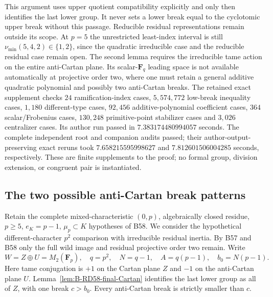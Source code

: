 \begin{remark}
\label{rem:B-RD58-scope}
This argument uses upper quotient compatibility explicitly and only
then identifies the last lower group. It never sets a lower break
equal to the cyclotomic upper break without this passage.
Reducible residual representations remain outside its scope.
At $p=5$ the unrestricted least-index interval is still
$\nu_{\min}(5,4,2)\in\{1,2\}$, since the quadratic irreducible
case and the reducible residual case remain open.
The second lemma requires the irreducible tame action on the entire
anti-Cartan plane. Its scalar-$\mathbf F_q$ leading space is not
available automatically at projective order two, where one must
retain a general additive quadratic polynomial and possibly two
anti-Cartan breaks.
The retained exact supplement
checks $24$ ramification-index cases, $5{,}574{,}772$ low-break
inequality cases, $1{,}180$ different-type cases, $92{,}456$
additive-polynomial coefficient cases, $364$ scalar/Frobenius cases,
$130{,}248$ primitive-point stabilizer cases and $3{,}026$ centralizer
cases. Its author run passed in $7.383174480994057$ seconds.
The complete independent root and companion audits passed; their
author-output-preserving exact reruns took $7.658215595998627$
and $7.812601506004285$ seconds, respectively.
These are finite supplements to the proof; no formal group,
division extension, or congruent pair is instantiated.
\end{remark}


\subsection{The two possible anti-Cartan break patterns}

Retain the complete mixed-characteristic $(0,p)$, algebraically closed
residue, $p\ge5$, $e_K=p-1$, $\mu_p\subset K$ hypotheses of B58.
We consider the hypothetical different-character $p^2$ comparison
with irreducible residual inertia. By B57 and B58 only the full
wild image and residual projective order two remain. Write
\[
 W=Z\oplus U=M_2(\mathbf F_p),\quad q=p^2,\quad N=q-1,
 \quad A=q(p-1),\quad b_0=N(p-1).
\]
Here tame conjugation is $+1$ on the Cartan plane $Z$ and $-1$ on
the anti-Cartan plane $U$. Lemma~\ref{lem:B-RD58-final-Cartan}
identifies the last lower group as all of $Z$, with one break
$c>b_0$. Every anti-Cartan break is strictly smaller than $c$.

